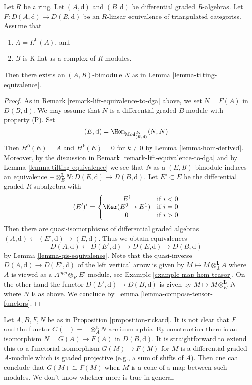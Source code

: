 \begin{proposition}
\label{proposition-rickard}
Let $R$ be a ring. Let $(A, \text{d})$ and $(B, \text{d})$ be
differential graded $R$-algebras. Let $F : D(A, \text{d}) \to D(B, \text{d})$
be an $R$-linear equivalence of triangulated categories. Assume that
\begin{enumerate}
\item $A = H^0(A)$, and
\item $B$ is K-flat as a complex of $R$-modules.
\end{enumerate}
Then there exists an $(A, B)$-bimodule $N$ as in
Lemma \ref{lemma-tilting-equivalence}.
\end{proposition}

\begin{proof}
As in Remark \ref{remark-lift-equivalence-to-dga} above, we set $N = F(A)$
in $D(B, \text{d})$. We may assume that $N$ is a differential graded
$B$-module with property (P). Set
$$
(E, \text{d}) = \Hom_{\text{Mod}^{dg}_{(B, \text{d})}}(N, N)
$$
Then $H^0(E) = A$ and $H^k(E) = 0$ for $k \not = 0$ by
Lemma \ref{lemma-hom-derived}.
Moreover, by the discussion in Remark \ref{remark-lift-equivalence-to-dga}
and by Lemma \ref{lemma-tilting-equivalence}
we see that $N$ as a $(E, B)$-bimodule induces an
equivalence $- \otimes_E^\mathbf{L} N : D(E, \text{d}) \to D(B, \text{d})$.
Let $E' \subset E$ be the differential graded $R$-subalgebra
with
$$
(E')^i = \left\{
\begin{matrix}
E^i & \text{if }i < 0 \\
\Ker(E^0 \to E^1) & \text{if }i = 0 \\
0 & \text{if }i > 0
\end{matrix}
\right.
$$
Then there are quasi-isomorphisms of differential graded
algebras $(A, \text{d}) \leftarrow (E', \text{d}) \rightarrow (E, \text{d})$.
Thus we obtain equivalences
$$
D(A, \text{d}) \leftarrow D(E', \text{d}) \rightarrow D(E, \text{d})
\rightarrow D(B, \text{d})
$$
by Lemma \ref{lemma-qis-equivalence}.
Note that the quasi-inverse $D(A, \text{d}) \to D(E', \text{d})$
of the left vertical arrow is given
by $M \mapsto M \otimes_A^\mathbf{L} A$ where $A$ is viewed as a
$A^{opp} \otimes_R E'$-module, see Example \ref{example-map-hom-tensor}.
On the other hand the functor $D(E', \text{d}) \to D(B, \text{d})$ is given by
$M \mapsto M \otimes_{E'}^\mathbf{L} N$ where $N$ is as above.
We conclude by Lemma \ref{lemma-compose-tensor-functors}.
\end{proof}

\begin{remark}
\label{remark-rickard}
Let $A, B, F, N$ be as in Proposition \ref{proposition-rickard}.
It is not clear that $F$ and the functor
$G(-) = - \otimes_A^\mathbf{L} N$ are isomorphic.
By construction there is an isomorphism
$N = G(A) \to F(A)$ in $D(B, \text{d})$.
It is straightforward to extend this to a functorial isomorphism
$G(M) \to F(M)$ for $M$ is a differential graded $A$-module which
is graded projective (e.g., a sum of shifts of $A$).
Then one can conclude that $G(M) \cong F(M)$ when $M$ is a cone
of a map between such modules. We don't know whether more is true
in general.
\end{remark}

